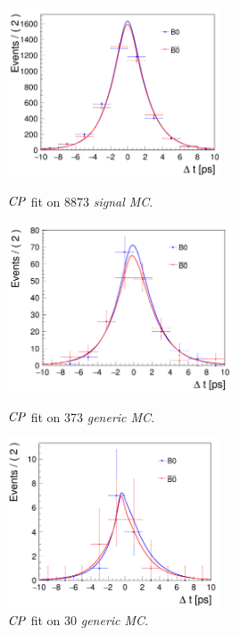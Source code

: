 \begin{figure}[htpb]
	\begin{minipage}{0.5\linewidth}
		\includegraphics[height=5cm]{figures/cpfit-10000sig}
		\caption{$\it{CP}$ fit on 8873 \textit{signal MC}.}
		\label{fig:cpfit_sig}
	\end{minipage}
	\begin{minipage}{0.5\linewidth}
		\includegraphics[height=5cm]{figures/cpfit-373gen}
		\caption{$\it{CP}$ fit on 373 \textit{generic MC}.}
		\label{fig:cpfit_gen}
	\end{minipage}
\vspace{0.5cm}
	\begin{minipage}{1\linewidth}
		\centering
		\includegraphics[height=5cm]{figures/cpfit-30gen}
		\caption{$\it{CP}$ fit on 30 \textit{generic MC}.}
		\label{fig:cpfit_gen_data}
	\end{minipage}
\end{figure}


